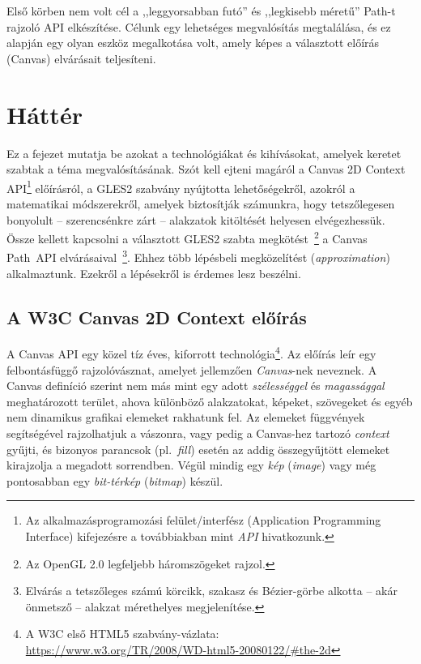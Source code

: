 \documentclass[12pt]{report}
\theoremstyle{definition}
\newcommand{\inenglish}[1]{\textsl{#1}}
\begin{document}
Első körben nem volt cél a ,,leggyorsabban futó'' és ,,legkisebb méretű''
Path-t rajzoló API elkészítése. Célunk egy lehetséges megvalósítás megtalálása,
és ez alapján egy olyan eszköz megalkotása volt, amely képes a választott
előírás (Canvas) elvárásait teljesíteni.



    \chapter{Háttér}
    \label{Háttér}

Ez a fejezet mutatja be azokat a technológiákat és kihívásokat, amelyek keretet
szabtak a téma megvalósításának. Szót kell ejteni magáról a Canvas 2D Context
API\footnote{Az alkalmazásprogramozási felület/interfész (Application
Programming Interface) kifejezésre a továbbiakban mint \emph{API} hivatkozunk.}
előírásról, a GLES2 szabvány nyújtotta lehetőségekről, azokról a matematikai
módszerekről, amelyek biztosítják számunkra, hogy tetszőlegesen bonyolult --
szerencsénkre zárt -- alakzatok kitöltését helyesen elvégezhessük. Össze
kellett kapcsolni a választott GLES2 szabta megkötést~\footnote { Az OpenGL 2.0
legfeljebb háromszögeket rajzol. } a Canvas Path~API elvárásaival~\footnote {
Elvárás a tetszőleges számú körcikk, szakasz és Bézier-görbe alkotta -- akár
önmetsző -- alakzat mérethelyes megjelenítése. }. Ehhez több lépésbeli
megközelítést (\inenglish{approximation}) alkalmaztunk. Ezekről a lépésekről is
érdemes lesz beszélni.

    \section[A Canvas előírás]{A W3C Canvas 2D Context előírás}
    \label{A Canvas előírás}

A Canvas API egy közel tíz éves, kiforrott technológia\footnote {A W3C első
HTML5 szabvány-vázlata:\\ \footnotesize{
\url{https://www.w3.org/TR/2008/WD-html5-20080122/\#the-2d}} }. Az előírás leír
egy felbontásfüggő rajzolóvásznat, amelyet jellemzően \emph{Canvas}-nek
neveznek. A Canvas definíció szerint nem más mint egy adott \emph{szélességgel}
és \emph{magassággal} meghatározott terület, ahova különböző alakzatokat,
képeket, szövegeket és egyéb nem dinamikus grafikai elemeket rakhatunk fel. Az
elemeket függvények segítségével rajzolhatjuk a vászonra, vagy pedig a
Canvas-hez tartozó \emph{context} gyűjti, és bizonyos parancsok
(pl.~\emph{fill}) esetén az addig összegyűjtött elemeket kirajzolja a megadott
sorrendben. Végül mindig egy \emph{kép} (\inenglish{image}) vagy még
pontosabban egy \emph{bit-térkép} (\inenglish{bitmap}) készül.
\end{document}
